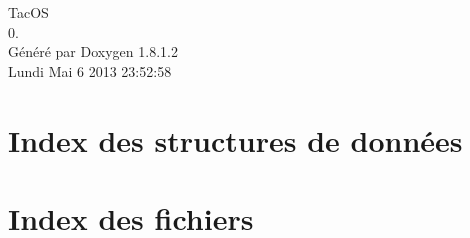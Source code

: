 \documentclass{book}
\begin{document}
\hypersetup{pageanchor=false,citecolor=blue}
\begin{titlepage}
\vspace*{7cm}
\begin{center}
{\Large Tac\-O\-S \\[1ex]\large 0. }\\
\vspace*{1cm}
{\large Généré par Doxygen 1.8.1.2}\\
\vspace*{0.5cm}
{\small Lundi Mai 6 2013 23:52:58}\\
\end{center}
\end{titlepage}
\clearemptydoublepage
{}
\tableofcontents
\clearemptydoublepage
{}
\hypersetup{pageanchor=true,citecolor=blue}
\chapter{Index des structures de données}

\chapter{Index des fichiers}

\end{document}

